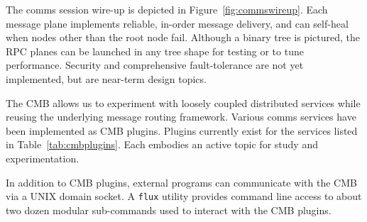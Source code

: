 The comms session wire-up is depicted in Figure~\ref{fig:commswireup}.
Each message plane implements reliable, in-order message delivery, and
can self-heal when nodes other than the root node fail.
Although a binary tree is pictured, the RPC planes can be launched in
any tree shape for testing or to tune performance.
Security and comprehensive fault-tolerance are not yet implemented,
but are near-term design topics.

The CMB allows us to experiment with loosely coupled distributed services
while reusing the underlying message routing framework. Various comms
services have been implemented as CMB plugins. Plugins currently exist for
the services listed in Table~\ref{tab:cmbplugins}.
Each embodies an active topic for study and experimentation. %

In addition to CMB plugins, external programs can communicate with the CMB
via a UNIX domain socket.  A {\tt flux} utility provides command line access
to about two dozen
modular sub-commands used to interact with the CMB plugins.


